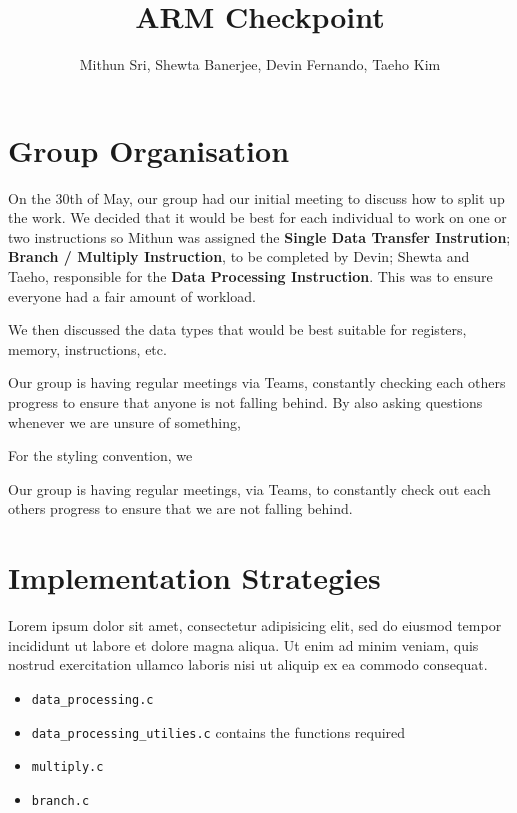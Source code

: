 \documentclass[11pt]{article}
\begin{document}
\title{ARM Checkpoint}
\author{Mithun Sri, Shewta Banerjee, Devin Fernando, Taeho Kim}

\maketitle

\section{Group Organisation}


\quad On the 30th of May, our group had our initial meeting to discuss how to split up the work. We decided that it would be best for each individual to work on one or two instructions so Mithun was assigned the {\bf Single Data Transfer Instrution}; {\bf Branch / Multiply Instruction}, to be completed by Devin; Shewta and Taeho, responsible for the {\bf Data Processing Instruction}. This was to ensure everyone had a fair amount of workload. 

We then discussed the data types that would be best suitable for registers, memory, instructions, etc.

Our group is having regular meetings via Teams, constantly checking each others progress to ensure that anyone is not falling behind. By also asking questions whenever we are unsure of something, 

For the styling convention, we 



Our group is having regular meetings, via Teams, to constantly check out each others progress to ensure that we are not falling behind. 

\section{Implementation Strategies}

Lorem ipsum dolor sit amet, consectetur adipisicing elit, sed do eiusmod tempor
incididunt ut labore et dolore magna aliqua. Ut enim ad minim veniam, quis
nostrud exercitation ullamco laboris nisi ut aliquip ex ea commodo consequat.

\begin{itemize}
    \item \texttt{data\_processing.c}
    \item \texttt{data\_processing\_utilies.c} contains the functions required 
    \item \texttt{multiply.c}
    \item \texttt{branch.c}
\end{itemize}
\end{document}
